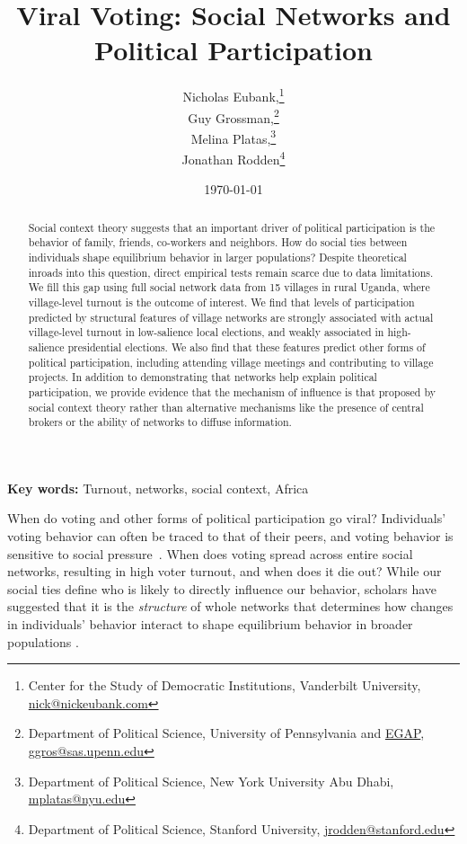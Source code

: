 \documentclass[12pt]{article}
\title{Viral Voting: Social Networks and Political Participation}
\date{\today}
\author{Nicholas Eubank,\footnote{Center for the Study of Democratic Institutions, Vanderbilt University, \href{mailto:nick@nickeubank.com}{nick@nickeubank.com}} \\ Guy Grossman,\footnote{Department of Political Science, University of Pennsylvania and \href{http://egap.org/}{EGAP}, \href{mailto:ggros@sas.upenn.edu}{ggros@sas.upenn.edu}} \\ Melina Platas,\footnote{Department of Political Science, New York University Abu Dhabi, \href{mailto:mplatas@nyu.edu}{mplatas@nyu.edu}} \\ Jonathan Rodden\footnote{Department of Political Science, Stanford University, \href{mailto:jrodden@stanford.edu}{jrodden@stanford.edu}}}
\providecommand{\keywords}[1]{\textbf{Key words:} #1}
\begin{document}
\maketitle

\begin{abstract}
    \noindent Social context theory suggests that an important driver of political participation is the behavior of family, friends, co-workers and neighbors. How do social ties between individuals shape equilibrium behavior in larger populations?  Despite theoretical inroads into this question, direct empirical tests remain scarce due to data limitations. We fill this gap using full social network data from 15 villages in rural Uganda, where village-level turnout is the outcome of interest.  We find that levels of participation predicted by structural features of village networks are strongly associated with actual village-level turnout in low-salience local elections, and weakly associated in high-salience presidential elections. We also find that these features predict other forms of political participation, including  attending village meetings and contributing to village projects. In addition to demonstrating that networks help explain political participation, we provide evidence that the mechanism of influence is that proposed by social context theory rather than alternative mechanisms like the presence of central brokers or the ability of networks to diffuse information.
\end{abstract}

\keywords{Turnout, networks, social context, Africa}

\pagebreak
\doublespace

When do voting and other forms of political participation go viral? Individuals' voting behavior can often be traced to that of their peers, and voting behavior is sensitive to social pressure~\citep{ioannides2013neighborhoods,Gerber:2008fs}. When does voting spread across entire social networks, resulting in high voter turnout, and when does it die out? While our social ties define who is likely to directly influence our behavior, scholars have suggested that it is the \emph{structure} of whole networks that determines how changes in individuals' behavior interact to shape equilibrium behavior in broader populations \citep{Siegel:2009vi,Sinclair:2012tq,Rolfe:2012ka,Fowler:2005ts,Larson:2016vk}.
\end{document}
